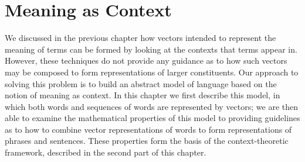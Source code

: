 
%

%

\chapter{Meaning as Context}
\label{meaning-context}

We discussed in the previous chapter how vectors intended to represent the meaning of terms can be formed by looking at the contexts that terms appear in. However, these techniques do not provide any guidance as to how such vectors may be composed to form representations of larger constituents. Our approach to solving this problem is to build an abstract model of language based on the notion of meaning as context. In this chapter we first describe this model, in which both words and sequences of words are represented by vectors; we are then able to examine the mathematical properties of this model to providing guidelines as to how to combine vector representations of  words to form representations of phrases and sentences. These properties form the basis of the context-theoretic framework, described in the second part of this chapter.


